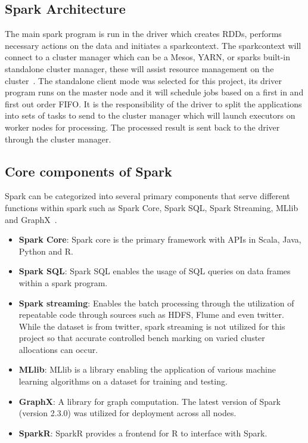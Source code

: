 \subsection{Spark Architecture}

The main spark program is run in the driver which creates RDDs,
performs necessary actions on the data and initiates a sparkcontext.
The sparkcontext will connect to a cluster manager which can be a
Mesos, YARN, or sparks built-in standalone cluster manager, these will
assist resource management on the cluster~\cite{www-aaspark}.  The
standalone client mode was selected for this project, its driver
program runs on the master node and it will schedule jobs based on a
first in and first out order FIFO. It is the responsibility of the
driver to split the applications into sets of tasks to send to the
cluster manager which will launch executors on worker nodes for
processing.  The processed result is sent back to the driver through
the cluster manager.


\subsection{Core components of Spark}

Spark can be categorized into several primary components that serve
different functions within spark such as Spark Core, Spark SQL, Spark
Streaming, MLlib and GraphX~\cite{www-hpspark}.

\begin{itemize}

 \item\textbf {Spark Core}: Spark core is the primary framework with
 APIs in Scala, Java, Python and R.

 \item\textbf{Spark SQL}: Spark SQL enables the usage of
 SQL queries on data frames within a spark program. 

 \item\textbf{Spark streaming}: Enables the batch processing through
the utilization of repeatable code through sources such as HDFS, Flume
and even twitter.  While the dataset is from twitter, spark streaming
is not utilized for this project so that accurate controlled bench
marking on varied cluster allocations can occur.

\item\textbf{MLlib}: MLlib is a
library enabling the application of various machine learning
algorithms on a dataset for training and testing.

\item\textbf{GraphX}: A library
for graph computation.  The latest version of Spark (version 2.3.0)
was utilized for deployment across all nodes.
\item\textbf{SparkR}: SparkR provides a frontend for R to interface with Spark.

\end{itemize}


